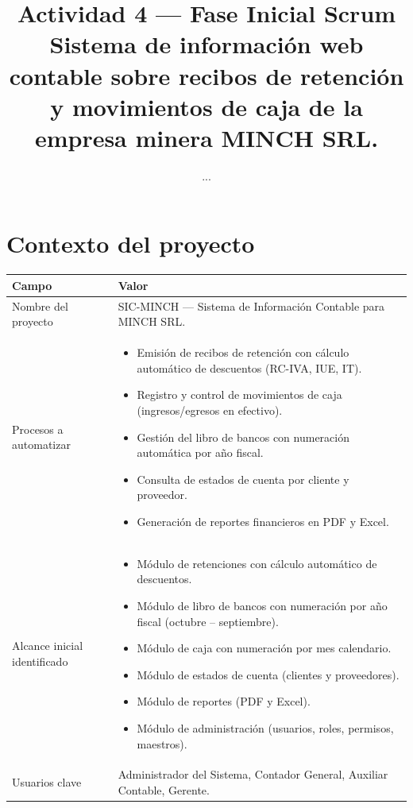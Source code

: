 \documentclass[stu]{apa7}
\title{Actividad 4 --- Fase Inicial Scrum \\ Sistema de información web contable sobre recibos de retención y movimientos de caja de la empresa minera MINCH SRL.}
\author{...}
\affiliation{...}
\begin{document}
\maketitle

\section{Contexto del proyecto}

\begin{longtable}{|L{4cm}|L{10cm}|}
\hline
{}
\textbf{Campo} & \textbf{Valor} \\
\hline
Nombre del proyecto & SIC-MINCH --- Sistema de Información Contable para MINCH SRL. \\
\hline
Procesos a automatizar & 
\begin{itemize}[nosep]
    \item Emisión de recibos de retención con cálculo automático de descuentos (RC-IVA, IUE, IT).
    \item Registro y control de movimientos de caja (ingresos/egresos en efectivo).
    \item Gestión del libro de bancos con numeración automática por año fiscal.
    \item Consulta de estados de cuenta por cliente y proveedor.
    \item Generación de reportes financieros en PDF y Excel.
\end{itemize} \\
\hline
Alcance inicial identificado & 
\begin{itemize}[nosep]
    \item Módulo de retenciones con cálculo automático de descuentos.
    \item Módulo de libro de bancos con numeración por año fiscal (octubre -- septiembre).
    \item Módulo de caja con numeración por mes calendario.
    \item Módulo de estados de cuenta (clientes y proveedores).
    \item Módulo de reportes (PDF y Excel).
    \item Módulo de administración (usuarios, roles, permisos, maestros).
\end{itemize} \\
\hline
Usuarios clave & Administrador del Sistema, Contador General, Auxiliar Contable, Gerente. \\
\hline
\end{longtable}
\end{document}
